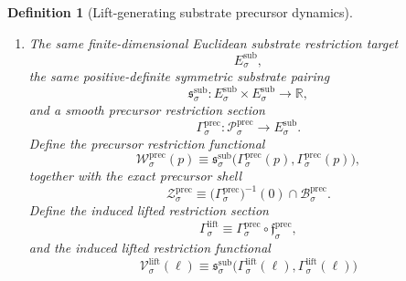 \documentclass[11pt]{article}
\newcommand{\SubBody}[1]{\mathcal B_{#1}^{\mathrm{sub}}}
\newcommand{\SubTarget}[1]{E_{#1}^{\mathrm{sub}}}
\newcommand{\SubPair}[1]{\mathfrak s_{#1}^{\mathrm{sub}}}
\newcommand{\LiftBody}[1]{\mathcal B_{#1}^{\mathrm{lift}}}
\newcommand{\LiftProj}[1]{\Pi_{#1}^{\mathrm{lift}}}
\newcommand{\LiftSelect}[1]{\mathfrak s_{#1}^{\mathrm{lift}}}
\newcommand{\LiftSection}[1]{\Gamma_{#1}^{\mathrm{lift}}}
\newcommand{\LiftFunctional}[1]{\mathscr V_{#1}^{\mathrm{lift}}}
\newcommand{\PrecSpace}[1]{\mathcal P_{#1}^{\mathrm{prec}}}
\newcommand{\PrecBody}[1]{\mathcal B_{#1}^{\mathrm{prec}}}
\newcommand{\PrecProj}[1]{\Pi_{#1}^{\mathrm{prec}}}
\newcommand{\PrecLiftMin}[1]{\mathfrak f_{#1}^{\mathrm{prec}}}
\newcommand{\PrecSubMin}[1]{\mathfrak m_{#1}^{\mathrm{prec}}}
\newcommand{\PrecSection}[1]{\Gamma_{#1}^{\mathrm{prec}}}
\newcommand{\PrecFunctional}[1]{\mathscr W_{#1}^{\mathrm{prec}}}
\newcommand{\PrecShellSet}[1]{\mathcal Z_{#1}^{\mathrm{prec}}}
\newtheorem{definition}{Definition}
\begin{document}
\begin{definition}[Lift-generating substrate precursor dynamics]
\begin{enumerate}
    There is a smooth precursor lift-fiber minimizer
    \[
    \PrecLiftMin{\sigma}:\LiftBody{\sigma}\to\PrecBody{\sigma}
    \]
    satisfying
    \[
    \PrecProj{\sigma}\circ\PrecLiftMin{\sigma}
    =
    \mathrm{id}_{\LiftBody{\sigma}},
    \]
    and a smooth precursor substrate-fiber minimizer
    \[
    \PrecSubMin{\sigma}:\SubBody{\sigma}\to\PrecBody{\sigma}
    \]
    satisfying
    \[
    \LiftProj{\sigma}\circ\PrecProj{\sigma}\circ\PrecSubMin{\sigma}
    =
    \mathrm{id}_{\SubBody{\sigma}}.
    \]
    Define
    \begin{equation}
    \LiftSelect{\sigma}
    \equiv
    \PrecProj{\sigma}\circ\PrecSubMin{\sigma}.
    \label{eq:inducedliftselect}
    \end{equation}
    Assume
    \begin{equation}
    \PrecLiftMin{\sigma}\bigl(\LiftSelect{\sigma}(m)\bigr)
    =
    \PrecSubMin{\sigma}(m)
    \qquad
    \text{for every }m\in\SubBody{\sigma}.
    \label{eq:compatmin}
    \end{equation}
    \item The same finite-dimensional Euclidean substrate restriction target
    \[
    \SubTarget{\sigma},
    \]
    the same positive-definite symmetric substrate pairing
    \[
    \SubPair{\sigma}:
    \SubTarget{\sigma}\times\SubTarget{\sigma}\to\mathbb R,
    \]
    and a smooth precursor restriction section
    \[
    \PrecSection{\sigma}:\PrecSpace{\sigma}\to\SubTarget{\sigma}.
    \]
    Define the precursor restriction functional
    \begin{equation}
    \PrecFunctional{\sigma}(p)
    \equiv
    \SubPair{\sigma}\bigl(\PrecSection{\sigma}(p),\PrecSection{\sigma}(p)\bigr),
    \label{eq:precfunctional}
    \end{equation}
    together with the exact precursor shell
    \begin{equation}
    \PrecShellSet{\sigma}
    \equiv
    \bigl(\PrecSection{\sigma}\bigr)^{-1}(0)\cap\PrecBody{\sigma}.
    \label{eq:precshell}
    \end{equation}
    Define the induced lifted restriction section
    \begin{equation}
    \LiftSection{\sigma}
    \equiv
    \PrecSection{\sigma}\circ\PrecLiftMin{\sigma},
    \label{eq:inducedliftsection}
    \end{equation}
    and the induced lifted restriction functional
    \begin{equation}
    \LiftFunctional{\sigma}(\ell)
    \equiv
    \SubPair{\sigma}\bigl(\LiftSection{\sigma}(\ell),\LiftSection{\sigma}(\ell)\bigr)

\end{equation}
\end{enumerate}
\end{definition}
\end{document}
